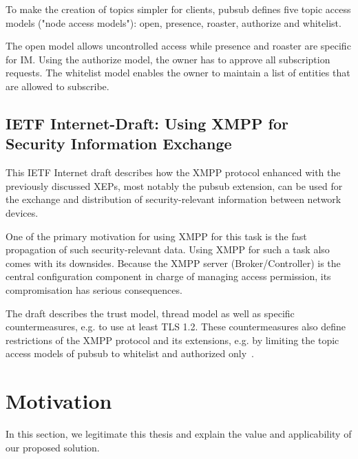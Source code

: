 To make the creation of topics simpler for clients, \gls{pubsub} defines five topic access models ("node access models"): open, presence, roaster, authorize and whitelist.

The open model allows uncontrolled access while presence and roaster are specific for IM. Using the authorize model, the owner has to approve all subscription requests. The whitelist model enables the owner to maintain a list of entities that are allowed to subscribe.

\subsection{IETF Internet-Draft: Using XMPP for Security Information Exchange}
This IETF Internet draft describes how the XMPP protocol enhanced with the previously discussed XEPs, most notably the \gls{pubsub} extension, can be used for the exchange and distribution of security-relevant information between network devices.

One of the primary motivation for using XMPP for this task is the fast propagation of such security-relevant data.
Using XMPP for such a task also comes with its downsides. Because the XMPP server (Broker/Controller) is the central configuration component in charge of managing access permission, its compromisation has serious consequences.

The draft describes the trust model, thread model as well as specific countermeasures, e.g. to use at least TLS 1.2. These countermeasures also define restrictions of the XMPP protocol and its extensions, e.g. by limiting the topic access models of \gls{pubsub} to whitelist and authorized only~\cite{ietf-mile-xmpp-grid-05}.

\section{Motivation}
In this section, we legitimate this thesis and explain the value and applicability of our proposed solution.
